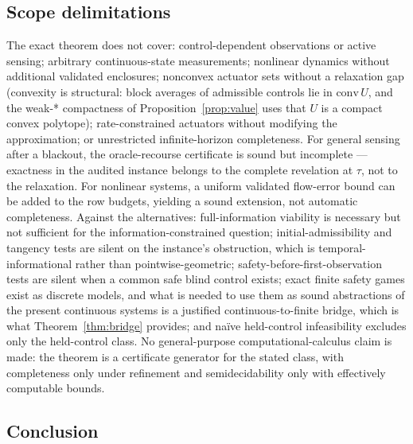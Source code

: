 \documentclass[10pt,twocolumn]{article}
\theoremstyle{plain}
\theoremstyle{definition}
\theoremstyle{remark}
\begin{document}
\subsection{Scope delimitations}\label{scope}

The exact theorem does not cover: control-dependent observations or active
sensing; arbitrary continuous-state measurements; nonlinear dynamics without
additional validated enclosures; nonconvex actuator sets without a relaxation gap (convexity is
structural: block averages of admissible controls lie in
\(\mathrm{conv}\,U\), and the weak-* compactness of
Proposition~\ref{prop:value} uses that \(U\) is a compact convex
polytope); rate-constrained actuators without modifying the
approximation; or unrestricted infinite-horizon completeness. For general
sensing after a blackout, the oracle-recourse certificate is sound but
incomplete --- exactness in the audited instance belongs to the complete
revelation at \(\tau\), not to the relaxation. For nonlinear systems, a uniform validated flow-error bound can
be added to the row budgets, yielding a sound extension, not automatic
completeness. Against the alternatives: full-information viability is necessary but not sufficient for the
information-constrained question; initial-admissibility and tangency tests
are silent on the instance's obstruction, which is temporal-informational
rather than pointwise-geometric; safety-before-first-observation tests are
silent when a common safe blind control exists; exact finite safety games
exist as discrete models, and what is needed to use them as sound
abstractions of the present continuous systems is a justified
continuous-to-finite bridge, which is what Theorem~\ref{thm:bridge}
provides; and na\"ive held-control infeasibility
excludes only the held-control class. No general-purpose
computational-calculus claim is made: the theorem is a certificate generator
for the stated class, with completeness only under refinement and
semidecidability only with effectively computable bounds.

\subsection{Conclusion}\label{conclusion}
\end{document}
